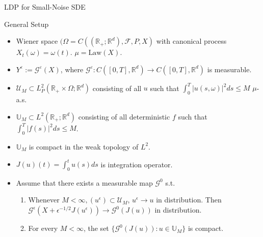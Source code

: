 \documentclass{if-beamer}
\begin{document}
\begin{frame}{LDP for Small-Noise SDE}
    \begin{block}{General Setup}
        \begin{itemize}[<+->]
            \item Wiener space $(\Omega = C((\mathbb{R}_+; \mathbb{R}^d), \mathcal{F}, P, X)$ with canonical process $X_t(\omega) = \omega(t)$. $\mu = \text{Law}(X)$.
            \item $Y^{\varepsilon} := \mathcal{G}^{\varepsilon}(X)$, where $\mathcal{G}^{\varepsilon}: C([0, T], \mathbb{R}^d) \to C([0, T], \mathbb{R}^d)$ is measurable.
            \item $\mathscr{U}_M \subset L^2_P(\mathbb{R}_+ \times \Omega; \mathbb{R}^d)$ consisting of all $u$ such that $\int_0^T |u(s, \omega)|^2 ds \leq M$ $\mu$-a.s.
            \item $\mathbb{U}_M \subset L^2(\mathbb{R}_+; \mathbb{R}^d)$ consisting of all deterministic $f$ such that $\int_0^T |f(s)|^2 ds \leq M$.
            \item $\mathbb{U}_M$ is compact in the weak topology of $L^2$.
            \item $J(u)(t) = \int_0^t u(s) ds$ is integration operator.
            \item Assume that there exists a measurable map $\mathcal{G}^0$ s.t.
            \begin{enumerate}
                \item Whenever $M < \infty, (u^\epsilon) \subset \mathscr{U}_M$, $u^\epsilon \to u$ in distribution.
                Then $\mathcal{G}^\epsilon(X + \epsilon^{-1/2} J(u^\epsilon)) \to \mathcal{G}^0(J(u))$ in distribution.
                \item For every $M < \infty$, the set $\{ \mathcal{G}^0(J(u)): u \in \mathbb{U}_M \}$ is compact.
            \end{enumerate}
        \end{itemize}
    \end{block}


\end{frame}
\end{document}
